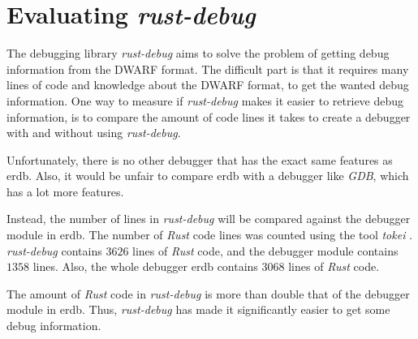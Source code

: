 
\section{Evaluating \emph{rust-debug}} \label{sec:evalrd}
The debugging library \emph{rust-debug} aims to solve the problem of getting debug information from the \gls{DWARF} format.
The difficult part is that it requires many lines of code and knowledge about the \gls{DWARF} format, to get the wanted debug information.
One way to measure if \emph{rust-debug} makes it easier to retrieve debug information, is to compare the amount of code lines it takes to create a debugger with and without using \emph{rust-debug}.


Unfortunately, there is no other debugger that has the exact same features as \gls{erdb}.
Also, it would be unfair to compare \gls{erdb} with a debugger like \emph{GDB}, which has a lot more features.


Instead, the number of lines in \emph{rust-debug} will be compared against the debugger module in \gls{erdb}.
The number of \emph{Rust} code lines was counted using the tool \emph{tokei} \cite{tokei}.
\emph{rust-debug} contains $3626$ lines of \emph{Rust} code, and the debugger module contains $1358$ lines.
Also, the whole debugger \gls{erdb} contains $3068$ lines of \emph{Rust} code.


The amount of \emph{Rust} code in \emph{rust-debug} is more than double that of the debugger module in \gls{erdb}.
Thus, \emph{rust-debug} has made it significantly easier to get some debug information.



